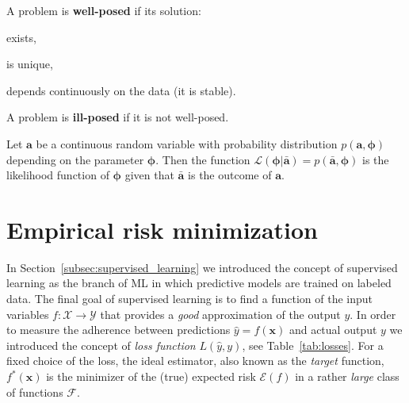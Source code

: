 \begin{definition}
	A problem is \textbf{well-posed} if its solution:
	\begin{enumerate*}[label=(\roman*)]
		\item exists,
		\item is unique,
		\item depends continuously on the data (\eg it is stable).
	\end{enumerate*}
\end{definition}

\begin{definition} \label{def:ill_posed}
	A problem is \textbf{ill-posed} if it is not well-posed.
\end{definition}

\begin{definition} \label{def:likelihood}
	Let $\bm{a}$ be a continuous random variable with probability distribution $p(\bm{a}, \bm{\phi})$ depending on the parameter $\bm{\phi}$. Then the function $\mathcal{L}(\bm{\phi}|\bm{\bar a})=p(\bm{\bar a},\bm{\phi})$ is the likelihood function of $\bm{\phi}$ given that $\bm{\bar a}$ is the outcome of $\bm{a}$.
\end{definition}


\section{Empirical risk minimization} \label{sec:erm}
In Section~\ref{subsec:supervised_learning} we introduced the concept of supervised learning as the branch of ML in which predictive models are trained on labeled data. The final goal of supervised learning is to find a function of the input variables $f: \mathcal{X} \rightarrow \mathcal{Y}$ that provides a \textit{good} approximation of the output $y$. In order to measure the adherence between predictions $\hat y = f(\bm{x})$ and actual output $y$ we introduced the concept of \textit{loss function} $L(\hat y, y)$, see Table~\ref{tab:losses}. For a fixed choice of the loss, the ideal estimator, also known as the \textit{target} function, $f^*(\bm{x})$ is the minimizer of the (true) expected risk $\mathcal{E}(f)$ in a rather \textit{large} class of functions $\mathcal{F}$.


